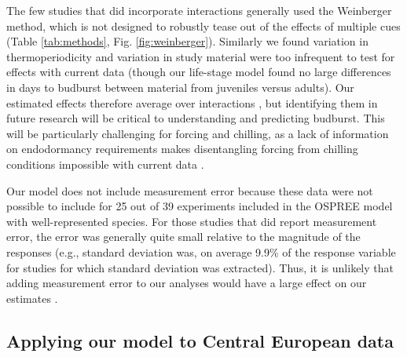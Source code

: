 \documentclass{article}
\begin{document}
The few studies that did incorporate interactions generally used the Weinberger method, which is not designed to robustly tease out of the effects of multiple cues (Table \ref{tab:methods}, Fig. \ref{fig:weinberger}).  Similarly we found variation in thermoperiodicity and variation in study material were too infrequent to test for effects with current data (though our life-stage model found no large differences in days to budburst between material from juveniles versus adults). Our estimated effects therefore average over interactions \emph{\citep{gelman2006}}, but identifying them in future research will be critical to understanding and predicting budburst. This will be particularly challenging for forcing and chilling, as a lack of information on endodormancy requirements makes  disentangling forcing from chilling conditions impossible with current data \emph{\citep{chuine2016}}.

\par Our model does not include measurement error because these data were not possible to include for 25 out of 39 experiments included in the OSPREE model with well-represented species. For those studies that did report measurement error, the error was generally quite small relative to the magnitude of the responses (e.g., standard deviation was, on average 9.9\% of the  response variable for studies for which standard deviation was extracted). Thus, it is unlikely that adding measurement error to our analyses would have a large effect on our estimates \emph{\citep{rstan2019}}. \\
 



\subsection*{Applying our model to Central European data}
\end{document}
